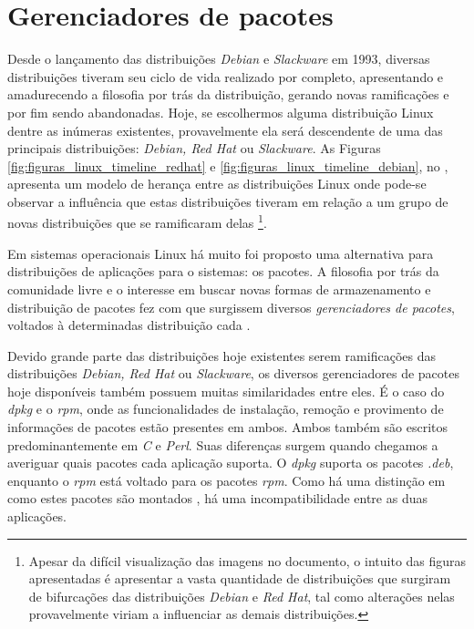 \section{Gerenciadores de pacotes} %
\label{sec:distribui_es_abordadas}


Desde o lançamento das distribuições \textit{Debian} e \textit{Slackware} em 1993, diversas distribuições tiveram seu ciclo de vida realizado por completo, apresentando e amadurecendo a filosofia por trás da distribuição, gerando novas ramificações e por fim sendo abandonadas. Hoje, se escolhermos alguma distribuição Linux dentre as inúmeras existentes, provavelmente ela será descendente de uma das principais distribuições: \textit{Debian, Red Hat} ou \textit{Slackware}. %
As Figuras \ref{fig:figuras_linux_timeline_redhat} e \ref{fig:figuras_linux_timeline_debian}, no , apresenta um modelo de herança entre as distribuições Linux onde pode-se observar a influência que estas distribuições tiveram em relação a um grupo de novas distribuições que se ramificaram delas%
\footnote{Apesar da difícil visualização das imagens no documento, o intuito das figuras apresentadas é apresentar a vasta quantidade de distribuições que surgiram de bifurcações das distribuições \textit{Debian} e \textit{Red Hat}, tal como alterações nelas provavelmente viriam a influenciar as demais distribuições.}.

Em sistemas operacionais Linux há muito foi proposto uma alternativa para distribuições de aplicações para o sistemas: os pacotes. A filosofia por trás da comunidade livre \cite{bretthauer2001open} e o interesse em buscar novas formas de armazenamento e distribuição de pacotes fez com que surgissem diversos \textit{gerenciadores de pacotes}, voltados à determinadas distribuição  cada \cite{beck2002linux}.

Devido grande parte das distribuições hoje existentes serem ramificações das distribuições \textit{Debian, Red Hat} ou \textit{Slackware}, %
os diversos gerenciadores de pacotes hoje disponíveis também possuem muitas similaridades entre eles.
É o caso do \textit{dpkg} e o \textit{rpm}, onde as funcionalidades de instalação, remoção e provimento de informações de pacotes estão presentes em ambos. Ambos também são escritos predominantemente em \textit{C} e \textit{Perl}. Suas diferenças surgem quando chegamos a averiguar quais pacotes cada aplicação suporta. O \textit{dpkg} suporta os pacotes \textit{.deb}, enquanto o \textit{rpm} está voltado para os pacotes \textit{rpm}. Como há uma distinção em como estes pacotes são montados \cite{bailey1997maximum}, há uma incompatibilidade entre as duas aplicações. 

